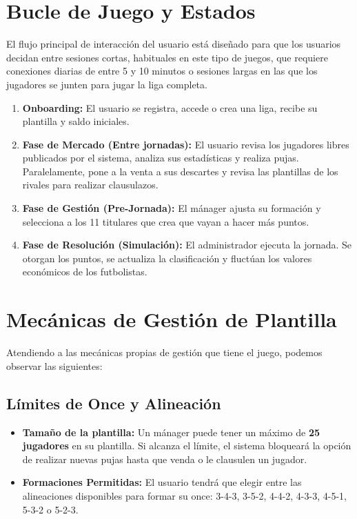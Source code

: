 \section{Bucle de Juego y Estados}
El flujo principal de interacción del usuario está diseñado para que los usuarios decidan entre sesiones cortas, habituales en este tipo de juegos, que requiere conexiones diarias de entre 5 y 10 minutos o sesiones largas en las que los jugadores se junten para jugar la liga completa.

\begin{enumerate}
    \item \textbf{Onboarding:} El usuario se registra, accede o crea una liga, recibe su plantilla y saldo iniciales.
    \item \textbf{Fase de Mercado (Entre jornadas):} El usuario revisa los jugadores libres publicados por el sistema, analiza sus estadísticas y realiza pujas. Paralelamente, pone a la venta a sus descartes y revisa las plantillas de los rivales para realizar clausulazos.
    \item \textbf{Fase de Gestión (Pre-Jornada):} El mánager ajusta su formación y selecciona a los 11 titulares que crea que vayan a hacer más puntos.
    \item \textbf{Fase de Resolución (Simulación):} El administrador ejecuta la jornada. Se otorgan los puntos, se actualiza la clasificación y fluctúan los valores económicos de los futbolistas.
\end{enumerate}

\section{Mecánicas de Gestión de Plantilla}
Atendiendo a las mecánicas propias de gestión que tiene el juego, podemos observar las siguientes:

\subsection{Límites de Once y Alineación}
\begin{itemize}
    \item \textbf{Tamaño de la plantilla:} Un mánager puede tener un máximo de \textbf{25 jugadores} en su plantilla. Si alcanza el límite, el sistema bloqueará la opción de realizar nuevas pujas hasta que venda o le clausulen un jugador.
    \item \textbf{Formaciones Permitidas:} El usuario tendrá que elegir entre las alineaciones disponibles para formar su once: 3-4-3, 3-5-2, 4-4-2, 4-3-3, 4-5-1, 5-3-2 o 5-2-3. 
\end{itemize}

